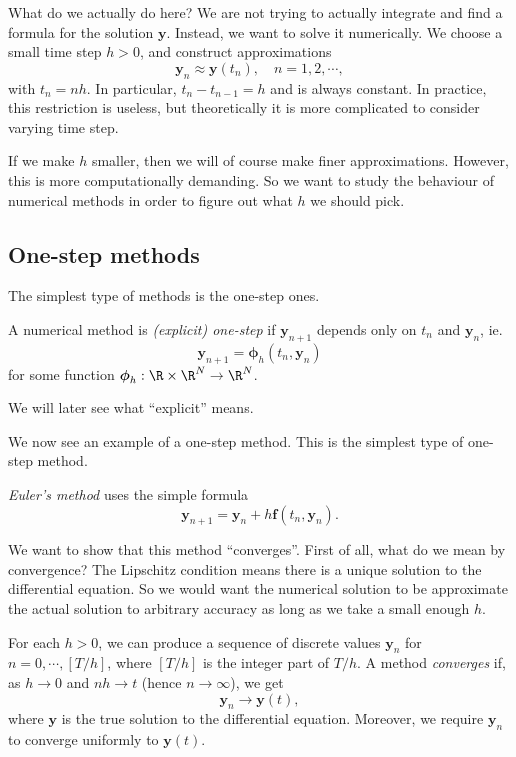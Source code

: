 \documentclass[a4paper]{article}
\begin{document}
What do we actually do here? We are not trying to actually integrate and find a formula for the solution $\mathbf{y}$. Instead, we want to solve it numerically. We choose a small time step $h > 0$, and construct approximations
\[
  \mathbf{y}_n \approx \mathbf{y}(t_n),\quad n = 1, 2, \cdots,
\]
with $t_n = nh$. In particular, $t_n - t_{n - 1} = h$ and is always constant. In practice, this restriction is useless, but theoretically it is more complicated to consider varying time step.

If we make $h$ smaller, then we will of course make finer approximations. However, this is more computationally demanding. So we want to study the behaviour of numerical methods in order to figure out what $h$ we should pick.

\subsection{One-step methods}
The simplest type of methods is the one-step ones.

\begin{defi}
  A numerical method is \emph{(explicit) one-step} if $\mathbf{y}_{n + 1}$ depends only on $t_n$ and $\mathbf{y}_n$, ie.
  \[
    \mathbf{y}_{n + 1} = \boldsymbol\phi_h(t_n, \mathbf{y}_n)
  \]
  for some function $\boldsymbol\phi_h: \R \times \R^N \to \R^N$.
\end{defi}
We will later see what ``explicit'' means.

We now see an example of a one-step method. This is the simplest type of one-step method.
\begin{defi}
  \emph{Euler's method} uses the simple formula
  \[
    \mathbf{y}_{n + 1} = \mathbf{y}_n + h\mathbf{f}(t_n, \mathbf{y}_n).
  \]
\end{defi}

We want to show that this method ``converges''. First of all, what do we mean by convergence? The Lipschitz condition means there is a unique solution to the differential equation. So we would want the numerical solution to be approximate the actual solution to arbitrary accuracy as long as we take a small enough $h$.

\begin{defi}
  For each $h > 0$, we can produce a sequence of discrete values $\mathbf{y}_n$ for $n = 0, \cdots, [T/h]$, where $[T/h]$ is the integer part of $T/h$. A method \emph{converges} if, as $h \to 0$ and $nh \to t$ (hence $n \to \infty$), we get
  \[
    \mathbf{y}_n \to \mathbf{y}(t),
  \]
  where $\mathbf{y}$ is the true solution to the differential equation. Moreover, we require $\mathbf{y}_n$ to converge uniformly to $\mathbf{y}(t)$.
\end{defi}
\end{document}
